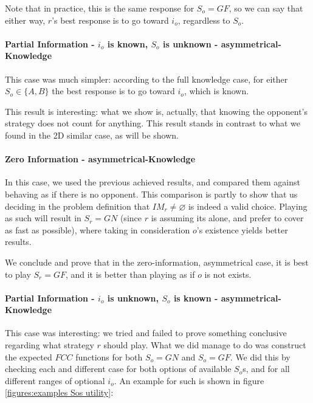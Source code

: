 \documentclass[a4paper,english,10pt]{article}
\newcommand\rob{\ensuremath{r}\xspace}
\newcommand\opp{\ensuremath{o}\xspace}
\newcommand{\fcc}{\ensuremath{FCC}\xspace}
\newcommand{\gn}{\ensuremath{GN}\xspace}
\newcommand{\gf}{\ensuremath{GF}\xspace}
\begin{document}
Note that in practice, this is the same response for $S_\opp = \gf$, so we can say that either way, \rob's best response is to go toward $i_\opp$, regardless to $S_\opp$.

\paragraph{Partial Information - $i_\opp$ is known, $S_\opp$ is unknown - asymmetrical-Knowledge}
This case was much simpler: according to the full knowledge case, for either $S_\opp \in \lbrace A,B \rbrace$ the best response is to go toward $i_\opp$, which is known.

This result is interesting: what we show is, actually, that knowing the opponent's strategy does not count for anything. This result stands in contrast to what we found in the 2D similar case, as will be shown.

\paragraph{Zero Information - asymmetrical-Knowledge}
In this case, we used the previous achieved results, and compared them against behaving as if there is no opponent. This comparison is partly to show that us deciding in the problem definition that $IM_\rob \neq \varnothing$ is indeed a valid choice.
Playing as such will result in $S_\rob=\gn$ (since \rob is assuming its alone, and prefer to cover as fast as possible), where taking in consideration \opp's existence yields better results.

We conclude and prove that in the zero-information, asymmetrical case, it is best to play $S_\rob=\gf$, and it is better than playing as if \opp is not exists. 

\paragraph{Partial Information - $i_\opp$ is unknown, $S_\opp$ is known - asymmetrical-Knowledge}
This case was interesting: we tried and failed to prove something conclusive regarding what strategy \rob should play.
What we did manage to do was construct the expected \fcc functions for both $S_\opp = \gn$ and $S_\opp = \gf$. We did this by checking each and different case for both options of available $S_\opp$s, and for all different ranges of optional $i_\opp$. An example for such is shown in figure \ref{figures:examples Sos utility}:
\end{document}
